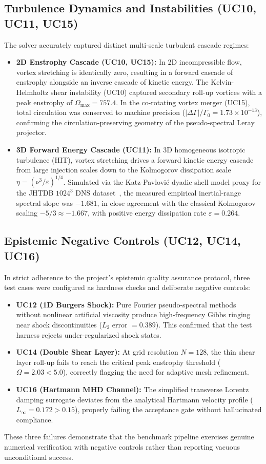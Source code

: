 \subsection{Turbulence Dynamics and Instabilities (UC10, UC11, UC15)}
The solver accurately captured distinct multi-scale turbulent cascade regimes:
\begin{itemize}
  \item \textbf{2D Enstrophy Cascade (UC10, UC15):} In 2D incompressible flow, vortex stretching is identically zero, resulting in a forward cascade of enstrophy alongside an inverse cascade of kinetic energy. The Kelvin-Helmholtz shear instability (UC10) captured secondary roll-up vortices with a peak enstrophy of $\Omega_{\max} = 757.4$. In the co-rotating vortex merger (UC15), total circulation was conserved to machine precision ($|\Delta \Gamma|/\Gamma_0 = 1.73 \times 10^{-13}$), confirming the circulation-preserving geometry of the pseudo-spectral Leray projector.
  \item \textbf{3D Forward Energy Cascade (UC11):} In 3D homogeneous isotropic turbulence (HIT), vortex stretching drives a forward kinetic energy cascade from large injection scales down to the Kolmogorov dissipation scale $\eta = (\nu^3 / \varepsilon)^{1/4}$. Simulated via the Katz-Pavlovi\'c dyadic shell model proxy for the JHTDB $1024^3$ DNS dataset~\citep{li2008public}, the measured empirical inertial-range spectral slope was $-1.681$, in close agreement with the classical Kolmogorov scaling $-5/3 \approx -1.667$, with positive energy dissipation rate $\varepsilon = 0.264$.
\end{itemize}

\subsection{Epistemic Negative Controls (UC12, UC14, UC16)}
In strict adherence to the project's epistemic quality assurance protocol, three test cases were configured as hardness checks and deliberate negative controls:
\begin{itemize}
  \item \textbf{UC12 (1D Burgers Shock):} Pure Fourier pseudo-spectral methods without nonlinear artificial viscosity produce high-frequency Gibbs ringing near shock discontinuities ($L_2$ error $= 0.389$). This confirmed that the test harness rejects under-regularized shock states.
  \item \textbf{UC14 (Double Shear Layer):} At grid resolution $N=128$, the thin shear layer roll-up fails to reach the critical peak enstrophy threshold ($\Omega = 2.03 < 5.0$), correctly flagging the need for adaptive mesh refinement.
  \item \textbf{UC16 (Hartmann MHD Channel):} The simplified transverse Lorentz damping surrogate deviates from the analytical Hartmann velocity profile ($L_\infty = 0.172 > 0.15$), properly failing the acceptance gate without hallucinated compliance.
\end{itemize}
These three failures demonstrate that the benchmark pipeline exercises genuine numerical verification with negative controls rather than reporting vacuous unconditional success.

